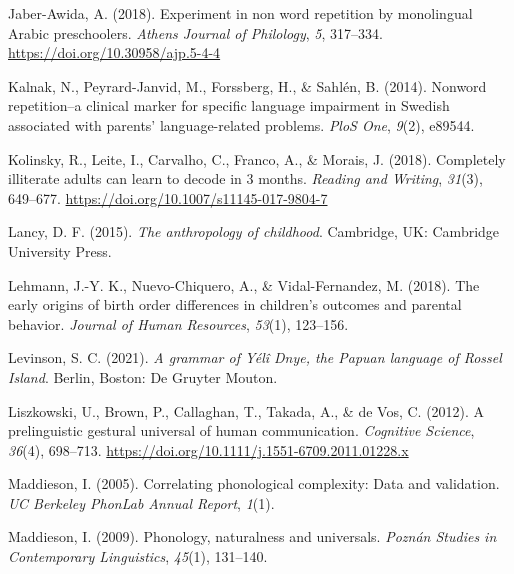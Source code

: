 \documentclass[
  american,
  ,man,floatsintext]{apa6}
\newlength{\cslhangindent}
\newlength{\cslentryspacingunit} %
\newenvironment{CSLReferences}[2] %
 {%
  \setlength{\parindent}{0pt}
  \ifodd #1
  \let\oldpar\par
  \def\par{\hangindent=\cslhangindent\oldpar}
  \fi
  \setlength{\parskip}{#2\cslentryspacingunit}
 }%
 {}
\begin{document}
\begin{CSLReferences}{1}{0}
\leavevmode{}%
Jaber-Awida, A. (2018). Experiment in non word repetition by monolingual {A}rabic preschoolers. \emph{Athens Journal of Philology}, \emph{5}, 317--334. \url{https://doi.org/10.30958/ajp.5-4-4}

\leavevmode{}%
Kalnak, N., Peyrard-Janvid, M., Forssberg, H., \& Sahlén, B. (2014). Nonword repetition--a clinical marker for specific language impairment in {S}wedish associated with parents' language-related problems. \emph{PloS One}, \emph{9}(2), e89544.

\leavevmode{}%
Kolinsky, R., Leite, I., Carvalho, C., Franco, A., \& Morais, J. (2018). Completely illiterate adults can learn to decode in 3 months. \emph{Reading and Writing}, \emph{31}(3), 649--677. \url{https://doi.org/10.1007/s11145-017-9804-7}

\leavevmode{}%
Lancy, D. F. (2015). \emph{The anthropology of childhood}. Cambridge, UK: Cambridge University Press.

\leavevmode{}%
Lehmann, J.-Y. K., Nuevo-Chiquero, A., \& Vidal-Fernandez, M. (2018). The early origins of birth order differences in children's outcomes and parental behavior. \emph{Journal of Human Resources}, \emph{53}(1), 123--156.

\leavevmode{}%
Levinson, S. C. (2021). \emph{A grammar of {Yélî D}nye, the {P}apuan language of {R}ossel {I}sland}. Berlin, Boston: De Gruyter Mouton.

\leavevmode{}%
Liszkowski, U., Brown, P., Callaghan, T., Takada, A., \& de Vos, C. (2012). A prelinguistic gestural universal of human communication. \emph{Cognitive Science}, \emph{36}(4), 698--713. \url{https://doi.org/10.1111/j.1551-6709.2011.01228.x}

\leavevmode{}%
Maddieson, I. (2005). Correlating phonological complexity: Data and validation. \emph{UC Berkeley PhonLab Annual Report}, \emph{1}(1).

\leavevmode{}%
Maddieson, I. (2009). Phonology, naturalness and universals. \emph{Pozn{á}n Studies in Contemporary Linguistics}, \emph{45}(1), 131--140.


\end{CSLReferences}
\end{document}
